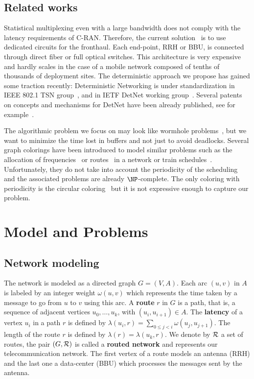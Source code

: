 \documentclass[10pt, conference, letterpaper]{IEEEtran}
\begin{document}
   \subsection*{Related works}
  
 Statistical multiplexing even with a large bandwidth does not comply with the latency requirements of C-RAN. Therefore, the current solution~\cite{pizzinat2015things,tayq2017real} is to use dedicated circuits for the fronthaul. Each end-point, RRH or BBU, is connected through direct fiber or full optical switches. This architecture is very expensive and hardly scales in the case of a mobile network composed of tenths of thousands of deployment sites. The deterministic approach we propose has gained some traction recently: Deterministic Networking is under standardization in IEEE 802.1 TSN group~\cite{finn-detnet-architecture-08}, and in  IETF DetNet working group~\cite{ieee802}. Several patents on concepts and mechanisms for DetNet have been already published, see for example~\cite{howe2005time,leclerc2016transmission}. 
     
The algorithmic problem we focus on may look like wormhole problems~\cite{cole1996benefit}, but  we want to minimize the time lost in buffers and not just to avoid deadlocks. Several graph colorings have been introduced to model similar problems such as the allocation of frequencies~\cite{borndorfer1998frequency}
or routes~\cite{cole1996benefit} in a network or train schedules~\cite{strotmann2007railway}. Unfortunately, they do not take into account the periodicity of the scheduling and the associated problems are already $\NP$-complete. The only coloring with periodicity is the circular coloring~\cite{zhou2013multiple} but it is not expressive enough to capture our problem.

\section{Model and Problems}\label{sec:def}

  \subsection{Network modeling}
  

The network is modeled as a directed graph $G=(V,A)$. Each arc  $(u,v)$ in $A$ is labeled by an integer weight $\omega(u,v)$ which represents the time taken by a message to go from $u$ to $v$ using this arc. A {\bf route} $r$ in $G$ is a path, that is, a sequence of adjacent vertices $u_0, \ldots , u_{k}$, with $(u_i,u_{i+1}) \in A$.  The {\bf latency} of a vertex $u_i$ in a path $r$ is defined by $\lambda(u_i,r)= \sum\limits_{0 \leq j <i} \omega(u_j, u_{j+1})$.
The length of the route $r$ is defined by $\lambda (r)= \lambda (u_k,r)$.
We denote by $\cal R$ a set of routes, the pair $(G,\cal R)$ is called a {\bf routed network} and represents our telecommunication network. The first vertex of a route models an antenna (RRH) and the last one a data-center (BBU) which processes the messages sent by the antenna.
\end{document}
